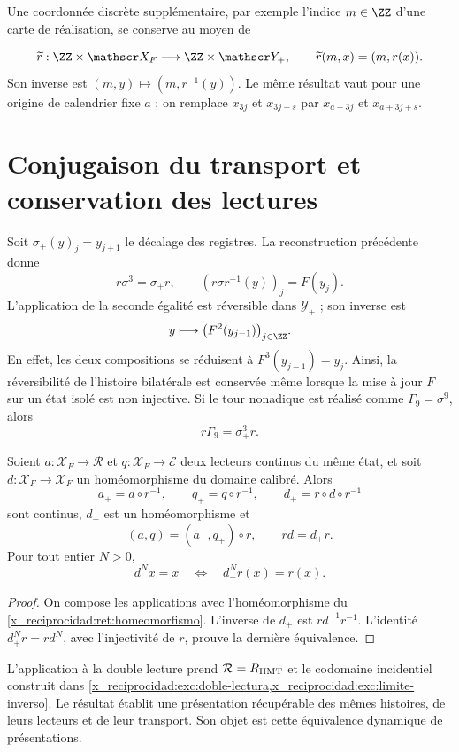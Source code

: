Une coordonnée discrète supplémentaire, par exemple l’indice \(m\in\ZZ\)
d’une carte de réalisation, se conserve au moyen de

\[
 \widetilde r:\ZZ\times\mathscr X_F
 \longrightarrow\ZZ\times\mathscr Y_+,
 \qquad \widetilde r(m,x)=(m,r(x)).
\]
Son inverse est \((m,y)\mapsto(m,r^{-1}(y))\).
Le même résultat vaut pour une origine de calendrier fixe \(a\) :
on remplace \(x_{3j}\) et \(x_{3j+s}\) par
\(x_{a+3j}\) et \(x_{a+3j+s}\).

\section{Conjugaison du transport et conservation des lectures}

Soit \(\sigma_+(y)_j=y_{j+1}\) le décalage des registres.
La reconstruction précédente donne
\begin{equation}
 r\sigma^3=\sigma_+r,\qquad
 (r\sigma r^{-1}(y))_j=F(y_j).
 \label{x_reciprocidad:ret:conjugacion}
\end{equation}
L’application de la seconde égalité est réversible dans
\(\mathscr Y_+\) ; son inverse est
\[
 y\longmapsto\bigl(F^2(y_{j-1})\bigr)_{j\in\ZZ}.
\]
En effet, les deux compositions se réduisent à
\(F^3(y_{j-1})=y_j\).
Ainsi, la réversibilité de l’histoire bilatérale est conservée même
lorsque la mise à jour \(F\) sur un état isolé est non injective.
Si le tour nonadique est réalisé comme \(\Gamma_9=\sigma^9\), alors
\begin{equation}
 r\Gamma_9=\sigma_+^3r.
 \label{x_reciprocidad:ret:vuelta-nonadica}
\end{equation}

\begin{corollary}
\label{x_reciprocidad:ret:lecturas}
Soient \(a:\mathscr X_F\to\mathcal R\) et
\(q:\mathscr X_F\to\mathcal E\) deux lecteurs continus du même
état, et soit \(d:\mathscr X_F\to\mathscr X_F\) un homéomorphisme du
domaine calibré. Alors
\[
 a_+=a\circ r^{-1},\qquad
 q_+=q\circ r^{-1},\qquad
 d_+=r\circ d\circ r^{-1}
\]
sont continus, \(d_+\) est un homéomorphisme et
\begin{equation}
 (a,q)=(a_+,q_+)\circ r,\qquad rd=d_+r.
 \label{x_reciprocidad:ret:factorizacion}
\end{equation}
Pour tout entier \(N>0\),
\[
 d^Nx=x\quad\Longleftrightarrow\quad d_+^Nr(x)=r(x).
\]
\end{corollary}
\begin{proof}
On compose les applications avec l’homéomorphisme du
\cref{x_reciprocidad:ret:homeomorfismo}. L’inverse de \(d_+\) est
\(rd^{-1}r^{-1}\). L’identité
\(d_+^Nr=rd^N\), avec l’injectivité de \(r\), prouve la
dernière équivalence.
\end{proof}

L’application à la double lecture prend
\(\mathcal R=R_{\rm HMT}\) et le codomaine incidentiel construit dans
\cref{x_reciprocidad:exc:doble-lectura,x_reciprocidad:exc:limite-inverso}.
Le résultat établit une présentation récupérable des mêmes
histoires, de leurs lecteurs et de leur transport. Son objet est cette
équivalence dynamique de présentations.

